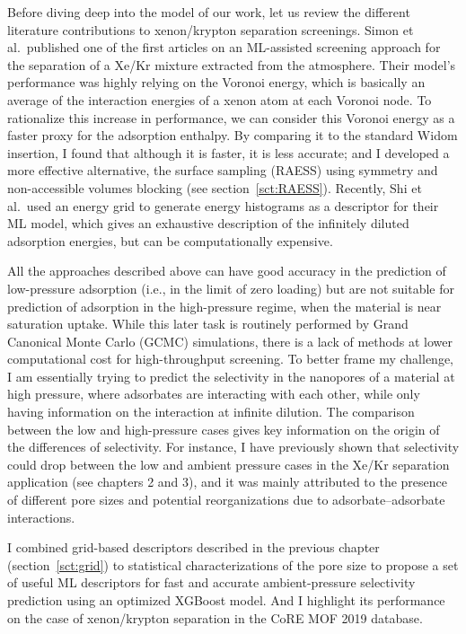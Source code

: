 \documentclass[main]{subfiles}
\begin{document}
Before diving deep into the model of our work, let us review the different literature contributions to xenon/krypton separation screenings. Simon et al.\ published one of the first articles on an ML-assisted screening approach for the separation of a Xe/Kr mixture extracted from the atmosphere.\autocite{Simon_2015} Their model's performance was highly relying on the Voronoi energy, which is basically an average of the interaction energies of a xenon atom at each Voronoi node.\autocite{Rycroft_2009} To rationalize this increase in performance, we can consider this Voronoi energy as a faster proxy for the adsorption enthalpy. By comparing it to the standard Widom insertion, I found that although it is faster, it is less accurate; and I developed a more effective alternative, the surface sampling (RAESS) using symmetry and non-accessible volumes blocking (see section~\ref{sct:RAESS}). Recently, Shi et al.\ used an energy grid to generate energy histograms as a descriptor for their ML model, which gives an exhaustive description of the infinitely diluted adsorption energies,\autocite{Shi_2023} but can be computationally expensive.

All the approaches described above can have good accuracy in the prediction of low-pressure adsorption (i.e., in the limit of zero loading) but are not suitable for prediction of adsorption in the high-pressure regime, when the material is near saturation uptake. While this later task is routinely performed by Grand Canonical Monte Carlo (GCMC) simulations, there is a lack of methods at lower computational cost for high-throughput screening. To better frame my challenge, I am essentially trying to predict the selectivity in the nanopores of a material at high pressure, where adsorbates are interacting with each other, while only having information on the interaction at infinite dilution. The comparison between the low and high-pressure cases gives key information on the origin of the differences of selectivity. For instance, I have previously shown that selectivity could drop between the low and ambient pressure cases in the Xe/Kr separation application (see chapters 2 and 3), and it was mainly attributed to the presence of different pore sizes and potential reorganizations due to adsorbate--adsorbate interactions.

I combined grid-based descriptors described in the previous chapter (section~\ref{sct:grid}) to statistical characterizations of the pore size to propose a set of useful ML descriptors for fast and accurate ambient-pressure selectivity prediction using an optimized XGBoost model. And I highlight its performance on the case of xenon/krypton separation in the CoRE MOF 2019 database\autocite{Chung_2019}.
\end{document}
